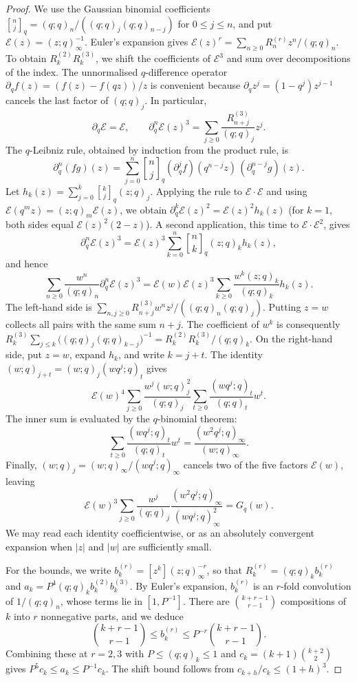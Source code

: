 \documentclass[11pt]{article}
\begin{document}
\begin{proof}
We use the Gaussian binomial coefficients
$\genfrac{[}{]}{0pt}{}{n}{j}_q=(q;q)_n/((q;q)_j(q;q)_{n-j})$ for
$0\le j\le n$, and put $\mathcal E(z)=(z;q)_\infty^{-1}$.
Euler's expansion gives
$\mathcal E(z)^r=\sum_{n\ge0}R_n^{(r)}z^n/(q;q)_n$.
To obtain $R_k^{(2)}R_k^{(3)}$, we shift the coefficients of
$\mathcal E^3$ and sum over decompositions of the index. The
unnormalised $q$-difference operator
$\partial_qf(z)=(f(z)-f(qz))/z$ is convenient because
$\partial_qz^j=(1-q^j)z^{j-1}$ cancels the last factor of $(q;q)_j$. In particular,
\[
 \partial_q\mathcal E=\mathcal E,\qquad
 \partial_q^n\mathcal E(z)^3
 =\sum_{j\ge0}\frac{R_{n+j}^{(3)}}{(q;q)_j}z^j.
\]
The $q$-Leibniz rule, obtained by induction from the product rule, is
\[
 \partial_q^n(fg)(z)=\sum_{j=0}^n\genfrac{[}{]}{0pt}{}{n}{j}_q
 (\partial_q^jf)(q^{n-j}z)\,(\partial_q^{n-j}g)(z).
\]
Let $h_k(z)=\sum_{j=0}^k\genfrac{[}{]}{0pt}{}{k}{j}_q(z;q)_j$.
Applying the rule to $\mathcal E\cdot\mathcal E$ and using
$\mathcal E(q^mz)=(z;q)_m\mathcal E(z)$, we obtain
$\partial_q^k\mathcal E(z)^2=\mathcal E(z)^2h_k(z)$
(for $k=1$, both sides equal $\mathcal E(z)^2(2-z)$).
A second application, this time to $\mathcal E\cdot\mathcal E^2$, gives
\[
 \partial_q^n\mathcal E(z)^3
 =\mathcal E(z)^3\sum_{k=0}^n\genfrac{[}{]}{0pt}{}{n}{k}_q(z;q)_kh_k(z),
\]
and hence
\[
 \sum_{n\ge0}\frac{w^n}{(q;q)_n}\partial_q^n\mathcal E(z)^3
 =\mathcal E(w)\mathcal E(z)^3
  \sum_{k\ge0}\frac{w^k(z;q)_k}{(q;q)_k}h_k(z).
\]
The left-hand side is
$\sum_{n,j\ge0}R_{n+j}^{(3)}w^nz^j/((q;q)_n(q;q)_j)$.
Putting $z=w$ collects all pairs with the same sum $n+j$.
The coefficient of $w^k$ is consequently
$R_k^{(3)}\sum_{j\le k}\bigl((q;q)_j(q;q)_{k-j}\bigr)^{-1}
=R_k^{(2)}R_k^{(3)}/(q;q)_k$.
On the right-hand side, put $z=w$, expand $h_k$, and write
$k=j+t$. The identity $(w;q)_{j+t}=(w;q)_j(wq^j;q)_t$ gives
\[
 \mathcal E(w)^4\sum_{j\ge0}\frac{w^j(w;q)_j^2}{(q;q)_j}
       \sum_{t\ge0}\frac{(wq^j;q)_t}{(q;q)_t}w^t.
\]
The inner sum is evaluated by the $q$-binomial theorem:
\[
 \sum_{t\ge0}\frac{(wq^j;q)_t}{(q;q)_t}w^t
 =\frac{(w^2q^j;q)_\infty}{(w;q)_\infty}.
\]
Finally, $(w;q)_j=(w;q)_\infty/(wq^j;q)_\infty$ cancels two
of the five factors $\mathcal E(w)$, leaving
\[
 \mathcal E(w)^3\sum_{j\ge0}\frac{w^j}{(q;q)_j}
       \frac{(w^2q^j;q)_\infty}{(wq^j;q)_\infty^2}
 =G_q(w).
\]
We may read each identity coefficientwise, or as an absolutely
convergent expansion when $|z|$ and $|w|$ are sufficiently small.

For the bounds, we write $b_k^{(r)}=[z^k](z;q)_\infty^{-r}$, so that
$R_k^{(r)}=(q;q)_kb_k^{(r)}$ and
$a_k=P^4(q;q)_kb_k^{(2)}b_k^{(3)}$. By Euler's expansion,
$b_k^{(r)}$ is an $r$-fold convolution of $1/(q;q)_n$, whose terms lie
in $[1,P^{-1}]$. There are $\binom{k+r-1}{r-1}$ compositions of $k$
into $r$ nonnegative parts, and we deduce
\[
 \binom{k+r-1}{r-1}\le b_k^{(r)}\le P^{-r}\binom{k+r-1}{r-1}.
\]
Combining these at $r=2,3$ with $P\le(q;q)_k\le1$ and
$c_k=(k+1)\binom{k+2}2$ gives $P^5c_k\le a_k\le P^{-1}c_k$. The shift bound
follows from $c_{k+h}/c_k\le(1+h)^3$.

\end{proof}
\end{document}
